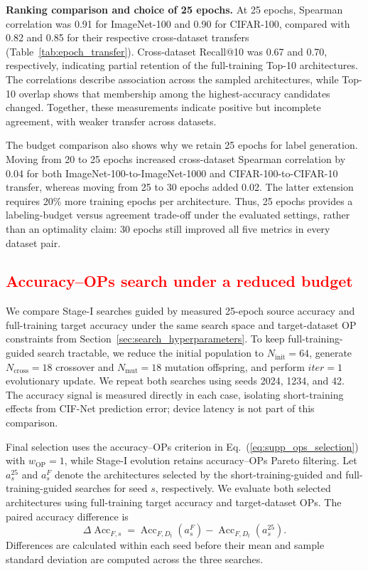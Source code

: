 \documentclass[preprint,review,12p,times]{elsarticle}
\begin{document}
\noindent\textbf{Ranking comparison and choice of 25 epochs.}
At 25 epochs, Spearman correlation was 0.91 for ImageNet-100 and 0.90 for CIFAR-100, compared with 0.82 and 0.85 for their respective cross-dataset transfers (Table~\ref{tab:epoch_transfer}). Cross-dataset Recall@10 was 0.67 and 0.70, respectively, indicating partial retention of the full-training Top-10 architectures. The correlations describe association across the sampled architectures, while Top-10 overlap shows that membership among the highest-accuracy candidates changed. Together, these measurements indicate positive but incomplete agreement, with weaker transfer across datasets.

The budget comparison also shows why we retain 25 epochs for label generation. Moving from 20 to 25 epochs increased cross-dataset Spearman correlation by 0.04 for both ImageNet-100-to-ImageNet-1000 and CIFAR-100-to-CIFAR-10 transfer, whereas moving from 25 to 30 epochs added 0.02. The latter extension requires 20\% more training epochs per architecture. Thus, 25 epochs provides a labeling-budget versus agreement trade-off under the evaluated settings, rather than an optimality claim: 30 epochs still improved all five metrics in every dataset pair.

\subsection{\textcolor{red}{Accuracy--OPs search under a reduced budget}}
\label{sec:supp_accuracy_ops_transfer}

We compare Stage-I searches guided by measured 25-epoch source accuracy and full-training target accuracy under the same search space and target-dataset OP constraints from Section~\ref{sec:search_hyperparameters}. To keep full-training-guided search tractable, we reduce the initial population to $N_{\text{init}}=64$, generate $N_{\text{cross}}=18$ crossover and $N_{\text{mut}}=18$ mutation offspring, and perform $iter=1$ evolutionary update. We repeat both searches using seeds 2024, 1234, and 42. The accuracy signal is measured directly in each case, isolating short-training effects from CIF-Net prediction error; device latency is not part of this comparison.

Final selection uses the accuracy--OPs criterion in Eq.~(\ref{eq:supp_ops_selection}) with $w_{\mathrm{OP}}=1$, while Stage-I evolution retains accuracy--OPs Pareto filtering. Let $a^{25}_s$ and $a^F_s$ denote the architectures selected by the short-training-guided and full-training-guided searches for seed $s$, respectively. We evaluate both selected architectures using full-training target accuracy and target-dataset OPs. The paired accuracy difference is
\begin{equation}
\Delta\operatorname{Acc}_{F,s}
=\operatorname{Acc}_{F,D_t}(a^F_s)
-\operatorname{Acc}_{F,D_t}(a^{25}_s).
\end{equation}
Differences are calculated within each seed before their mean and sample standard deviation are computed across the three searches.
\end{document}

